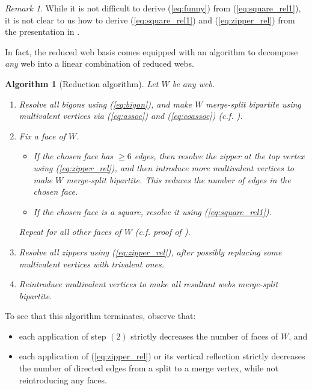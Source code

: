 \documentclass[11pt,a4paper,reqno]{amsart}
\numberwithin{equation}{section}
\newtheorem{algorithm}[thm]{Algorithm}
\theoremstyle{definition}
\theoremstyle{remark}
\newtheorem{remark}[thm]{Remark}
\begin{document}
\begin{remark}
    While it is not difficult to derive (\ref{eq:funny}) from (\ref{eq:square_rel1}), it is not clear to us how to derive (\ref{eq:square_rel1}) and (\ref{eq:zipper_rel}) from the presentation in . 
\end{remark}

In fact, the reduced web basis comes equipped with an algorithm to decompose \emph{any} web into a linear combination of reduced webs.


\begin{algorithm}[Reduction algorithm]\label{algo:red} Let $W$ be any web.
\begin{enumerate}
    \item Resolve all bigons using (\ref{eq:bigon}), and make $W$ merge-split bipartite using multivalent vertices via (\ref{eq:assoc}) and (\ref{eq:coassoc}) (c.f. ).
    \item Fix a face of $W$. 
    \begin{itemize}
        \item If the chosen face has $\ge6$ edges, then resolve the zipper at the top vertex using (\ref{eq:zipper_rel}), and then introduce more multivalent vertices to make $W$ merge-split bipartite. This reduces the number of edges in the chosen face.
        \item If the chosen face is a square, resolve it using (\ref{eq:square_rel1}).
    \end{itemize}
    Repeat for all other faces of $W$ (c.f. proof of ).
    \item Resolve all zippers using (\ref{eq:zipper_rel}), after possibly replacing some multivalent vertices with trivalent ones.
    \item Reintroduce multivalent vertices to make all resultant webs merge-split bipartite.
\end{enumerate}
\end{algorithm}

To see that this algorithm terminates, observe that:
\begin{itemize}
    \item each application of step $(2)$ strictly decreases the number of faces of $W$, and
    \item each application of (\ref{eq:zipper_rel}) or its vertical reflection strictly decreases the number of directed edges from a split to a merge vertex, while not reintroducing any faces.
\end{itemize}
    
\end{document}
